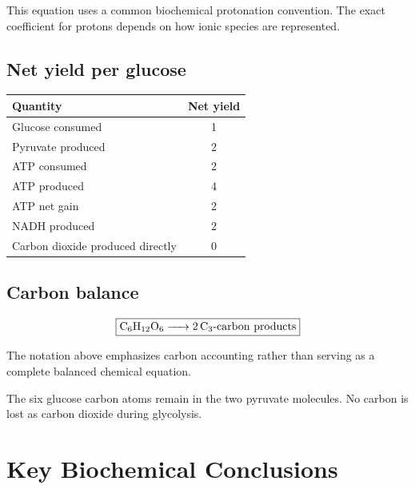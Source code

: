 \documentclass[11pt,a4paper]{article}
\begin{document}
This equation uses a common biochemical protonation convention.
The exact coefficient for protons depends on how ionic species
are represented.

\subsection{Net yield per glucose}

\begin{center}
\begin{tabular}{lc}
\toprule
\textbf{Quantity} & \textbf{Net yield}\\
\midrule
Glucose consumed & 1\\
Pyruvate produced & 2\\
ATP consumed & 2\\
ATP produced & 4\\
ATP net gain & 2\\
NADH produced & 2\\
Carbon dioxide produced directly & 0\\
\bottomrule
\end{tabular}
\end{center}

\subsection{Carbon balance}

\[
\boxed{
\ce{C6H12O6 -> 2 C3\text{-}carbon\ products}
}
\]

The notation above emphasizes carbon accounting rather than
serving as a complete balanced chemical equation.

The six glucose carbon atoms remain in the two pyruvate molecules.
No carbon is lost as carbon dioxide during glycolysis.

\section{Key Biochemical Conclusions}
\label{sec:conclusions}
\end{document}
